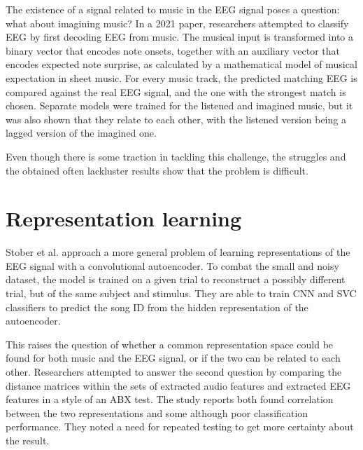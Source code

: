 The existence of a signal related to music in the EEG signal poses a question: what about imagining music?
In a 2021 paper, researchers attempted to classify EEG by first decoding EEG from music\cite{silence}.
The musical input is transformed into a binary vector that encodes note onsets, together with an auxiliary vector that encodes expected note surprise,
as calculated by a mathematical model of musical expectation in sheet music.
For every music track, the predicted matching EEG is compared against the real EEG signal, and the one with the strongest match is chosen.
Separate models were trained for the listened and imagined music, but it was also shown that they relate to each other, with the listened version being a lagged version of the imagined one.

Even though there is some traction in tackling this challenge, the struggles and the obtained often lackluster results show that the problem is difficult.

\section{Representation learning}

Stober et al. approach a more general problem of learning representations of the EEG signal with a convolutional autoencoder\cite{stober}.
To combat the small and noisy dataset, the model is trained on a given trial to reconstruct a possibly different trial, but of the same subject and stimulus.
They are able to train CNN and SVC classifiers to predict the song ID from the hidden representation of the autoencoder.

This raises the question of whether a common representation space could be found for both music and the EEG signal, or if the two can be related to each other.
Researchers attempted to answer the second question by comparing the distance matrices within the sets of extracted audio features and extracted EEG features\cite{foster} in a style of an ABX test.
The study reports both found correlation between the two representations and some although poor classification performance. They noted a need for repeated testing to get more certainty about the result.



